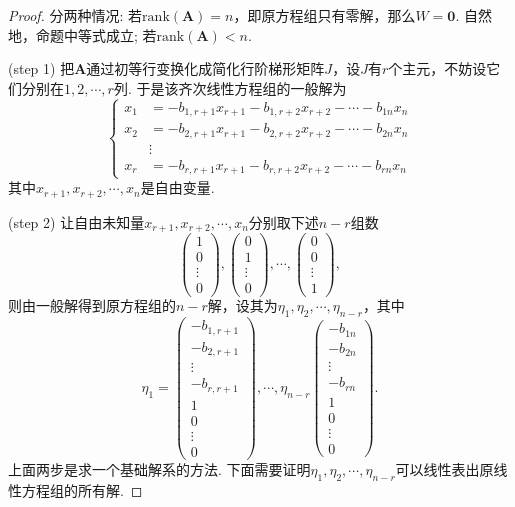 \documentclass{article}
\newcommand{\mbf}[1]{\bm{#1}}
\newcommand{\rank}[1]{\text{rank}(#1)} %
\begin{document}
\begin{proof}
分两种情况: 若$\rank{\mbf{A}} = n$，即原方程组只有零解，那么$W = {\mbf{0}}$. 自然地，命题中等式成立; 若$\rank{\mbf{A}} < n$.

(step 1) 把$\mbf{A}$通过初等行变换化成简化行阶梯形矩阵$J$，设$J$有$r$个主元，不妨设它们分别在$1,2,\cdots,r$列. 于是该齐次线性方程组的一般解为
$$
\left\{
\begin{array}{ll}
x_1 &= -b_{1,r+1}x_{r+1} - b_{1,r+2}x_{r+2} - \cdots - b_{1n} x_{n} \\
x_2 &= -b_{2,r+1}x_{r+1} - b_{2,r+2}x_{r+2} - \cdots - b_{2n} x_{n} \\
&\vdots \\
x_r &= -b_{r,r+1}x_{r+1} - b_{r,r+2}x_{r+2} - \cdots - b_{rn} x_{n}
\end{array}
\right.
$$
其中$x_{r+1},x_{r+2},\cdots,x_{n}$是自由变量.

(step 2) 让自由未知量$x_{r+1},x_{r+2},\cdots,x_{n}$分别取下述$n-r$组数
$$
\begin{pmatrix}
1 \\
0 \\
\vdots \\
0
\end{pmatrix},
\begin{pmatrix}
0 \\
1 \\
\vdots \\
0
\end{pmatrix},
\cdots,
\begin{pmatrix}
0 \\
0 \\
\vdots \\
1
\end{pmatrix},
$$
则由一般解得到原方程组的$n-r$解，设其为$\eta_1,\eta_2,\cdots,\eta_{n-r}$，其中
$$
\eta_1 = 
\begin{pmatrix}
-b_{1,r+1}\\
-b_{2,r+1}\\
\vdots\\
-b_{r,r+1}\\
1 \\
0 \\
\vdots \\
0
\end{pmatrix},
\cdots,
\eta_{n-r}
\begin{pmatrix}
-b_{1n}\\
-b_{2n}\\
\vdots\\
-b_{rn}\\
1 \\
0 \\
\vdots \\
0
\end{pmatrix}.
$$
上面两步是求一个基础解系的方法. 下面需要证明$\eta_1,\eta_2,\cdots,\eta_{n-r}$可以线性表出原线性方程组的所有解.
\end{proof}
\end{document}
